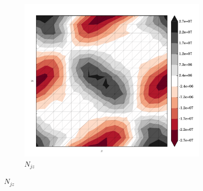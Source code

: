 \begin{figure}
  \begin{subfigure}[b]{0.3\linewidth}
    \includegraphics[width=\linewidth]{images/stress_balance/RS/N_jz.pdf}
  \caption{$N_{jz}$}
  \label{rs_N_jz}
  \end{subfigure}


\end{figure}
